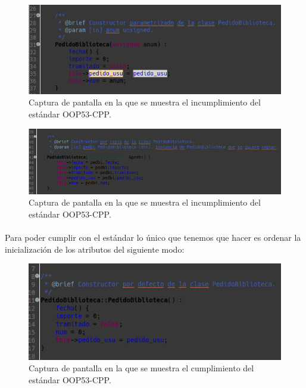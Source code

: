 			\begin{figure}[H]
				\centering
				\includegraphics[scale=0.7]{img/captura22.png}
				\caption{Captura de pantalla en la que se muestra el incumplimiento del estándar OOP53-CPP.}
				\label{captura22}
			\end{figure}
		
			\begin{figure}[H]
				\centering
				\includegraphics[scale=0.5]{img/captura25.png}
				\caption{Captura de pantalla en la que se muestra el incumplimiento del estándar OOP53-CPP.}
				\label{captura25}
			\end{figure}
		
			\paragraph{}Para poder cumplir con el estándar lo único que tenemos que hacer es ordenar la inicialización de los atributos del siguiente modo:
			
			\begin{figure}[H]
				\centering
				\includegraphics[scale=0.7]{img/captura23.png}
				\caption{Captura de pantalla en la que se muestra el cumplimiento del estándar OOP53-CPP.}
				\label{captura23}
			\end{figure}
			
